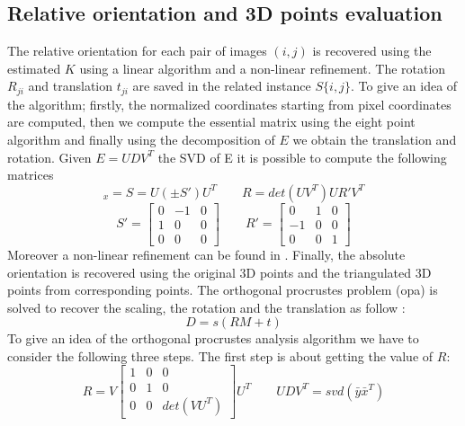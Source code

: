 \documentclass[11pt]{article}
\begin{document}
\newpage
\subsection{Relative orientation and 3D points evaluation}
The relative orientation for each pair of images $(i,j)$ is recovered using the estimated $K$ using a linear algorithm and a non-linear refinement. The rotation $R_{ji}$ and translation $t_{ji}$ are saved in the related instance $S\{i,j\}$. To give an idea of the algorithm; firstly, the normalized coordinates starting from pixel coordinates are computed, then we compute the essential matrix using the eight point algorithm and finally using the decomposition of $E$ we obtain the translation and rotation.
Given $E = UDV^T$ the SVD of E it is possible to compute the following matrices
\begin{equation}
    [t]_x = S = U(\pm S')U^T \qquad
    R = det(UV^T)UR'V^T
\end{equation}
\begin{equation}
    S' = \begin{bmatrix}
        0 & -1 & 0 \\ 1 & 0 & 0 \\ 0 & 0 & 0
    \end{bmatrix} \qquad
    R' = \begin{bmatrix}
        0 & 1 & 0 \\ -1 & 0 & 0 \\ 0 & 0 & 1
    \end{bmatrix} 
\end{equation}
Moreover a non-linear refinement can be found in \cite{Horn}.
Finally, the absolute orientation is recovered using the original 3D points and the triangulated 3D points from corresponding points. The orthogonal procrustes problem (opa) is solved to recover the scaling, the rotation and the translation as follow \cite{Arun}:
\begin{equation}
    D=s(RM+t)
\end{equation}
To give an idea of the orthogonal procrustes analysis algorithm we have to consider the following three steps. The first step is about getting the value of $R$:
\begin{equation}
    R = V\begin{bmatrix}
        1 & 0 & 0 \\ 0 & 1 & 0 \\ 0 & 0 & det(VU^{T})
    \end{bmatrix} U^{T} \qquad UDV^{T} = svd(\bar{y}\bar{x}^T)
\end{equation}
\end{document}
